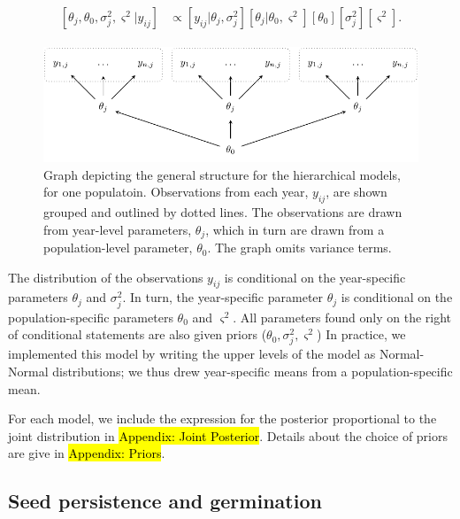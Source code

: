 \documentclass[12pt, oneside, titlepage]{article}   	%
\begin{document}
\begin{align}
  \begin{split}
  [ \theta_j , \theta_0 , \sigma_j^2 , \varsigma^2 | y_{ij} ] &  \propto [ y_{ij} | \theta_j , \sigma^2_j] [ \theta_j | \theta_0 , \varsigma^2 ] [ \theta_0 ] [ \sigma^2_j] [ \varsigma^2].
  \end{split}
\end{align}

\begin{figure}
       \includegraphics[scale=.65]{../../manuscript/figures/hierarchical-dag.pdf}  
    \caption{ Graph depicting the general structure for the hierarchical models, for one populatoin. Observations from each year, $y_{ij}$, are shown grouped and outlined by dotted lines. The observations are drawn from year-level parameters, $\theta_j$, which in turn are drawn from a population-level parameter, $\theta_0$. The graph omits variance terms. }
 \label{fig:hierarchical-dag}
\end{figure}

The distribution of the observations $y_{ij}$ is conditional on the year-specific parameters $\theta_j$ and $\sigma^2_j$. In turn, the year-specific parameter $\theta_j$ is conditional on the population-specific parameters $\theta_0$ and $ \varsigma^2$. All parameters found only on the right of conditional statements are also given priors ($\theta_0, \sigma^2_j, \varsigma^2$) In practice, we implemented this model by writing the upper levels of the model as Normal-Normal distributions; we thus drew year-specific means from a population-specific mean.

For each model, we include the expression for the posterior proportional to the joint distribution in \hl{Appendix: Joint Posterior}. Details about the choice of priors are give in \hl{Appendix: Priors}.

\subsection{Seed persistence and germination}
\end{document}

